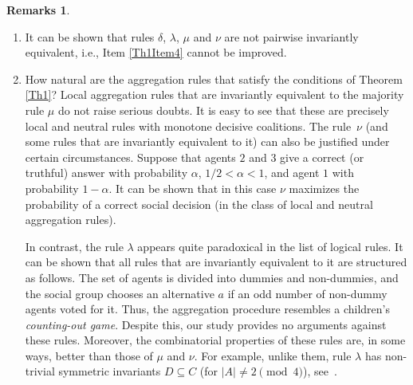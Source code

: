 \documentclass[graybox]{SNmult}
\theoremstyle{definition}
\newtheorem*{rems}{Remarks}
\begin{document}
\begin{rems}
\begin{enumerate}
		$$
		f(c_{\prec_1}, c_{\prec_2})= c_{\prec_1}\text{ and } f(c_{\prec_2}, c_{\prec_1})= c_{\prec_2}
		$$
		if $\{x_1, x_2\}$ is either $\{a_1, a_3\}$ or $\{a_2, a_4\}$, and 
		$$
		f(c_{\prec_1}, c_{\prec_2})= c_{\prec_2}\text{ and } f(c_{\prec_2}, c_{\prec_1})= c_{\prec_1},
		$$
		otherwise.
		\par In general, the combinatorics of aggregation on a four-element set of alternatives turns out to be the most complex. It can be shown that no non-dictatorial local aggregation rule has a symmetric invariant $D\subseteq C$. Moreover, the model of individual choice from three-element sets of alternatives already provides such an example, see \cite{Polyakov1}. The equivalence of Items (\ref{Th1Item3}) and (\ref{Th1Item4}) of Theorem \ref{Th1} remains true in the case $|A|=4$.
		\par For the case of an infinite number of alternatives, see \cite{Fish}.
		\item It can be shown that rules $\delta$, $\lambda$, $\mu$ and $\nu$ are not pairwise invariantly equivalent, i.e., Item \ref{Th1Item4} cannot be improved.
		\item How natural are the aggregation rules that satisfy the conditions of Theorem \ref{Th1}? Local aggregation rules that are invariantly equivalent to the majority rule $\mu$ do not raise serious doubts. It is easy to see that these are precisely local and neutral rules with monotone decisive coalitions. The rule~$\nu$ (and some rules that are invariantly equivalent to it) can also be justified under certain circumstances. Suppose that agents $2$ and $3$ give a correct (or truthful) answer with probability $\alpha$, $1/2<\alpha<1$, and agent $1$ with probability $1-\alpha$. It can be shown that in this case $\nu$ maximizes the probability of a correct social decision (in the class of local and neutral aggregation rules). \par In contrast, the rule $\lambda$ appears quite paradoxical in the list of logical rules. It can be shown that all rules that are invariantly equivalent to it are structured as follows. The set of agents is divided into dummies and non-dummies, and the social group chooses an alternative $a$ if an odd number of non-dummy agents voted for it. Thus, the aggregation procedure resembles a children's \textit{counting-out game}. Despite this, our study provides no arguments against these rules. Moreover, the combinatorial properties of these rules are, in some ways, better than those of $\mu$ and $\nu$. For example, unlike them, rule $\lambda$ has non-trivial symmetric invariants $D\subseteq C$ (for $|A|\neq 2\pmod{4}$), see~\cite{Polyakov1}.
	\end{enumerate}
\end{rems}
\end{document}
